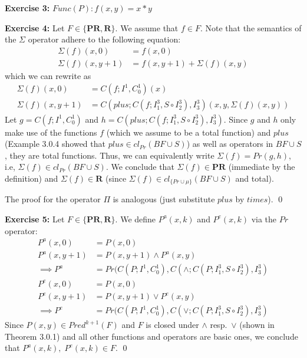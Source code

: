 \documentclass [11pt]{article}
\newcommand{\PR}{\textbf{PR}}
\newcommand{\R}{\textbf{R}}
\begin{document}
\bigskip
\noindent
\textbf{Exercise 3:}
$Func(P): f(x,y) = x*y$

\bigskip
\noindent
\textbf{Exercise 4:}
Let $F \in \{\PR, \R\}$. 
We assume that $f \in F$.
Note that the semantics of the $\Sigma$ operator adhere to the following equation:
\begin{align*}
\Sigma(f)(x,0) &= f(x,0) \\
\Sigma(f)(x, y+1) &= f(x,y+1) + \Sigma(f)(x,y)
\end{align*}
which we can rewrite as
\begin{align*}
\Sigma(f)(x,0) &= C(f; I^1, C^1_0)(x) \\
\Sigma(f)(x, y+1) &= C(plus; C(f; I^3_1, S \circ I^3_2), I^3_3) (x,y, \Sigma(f)(x,y))
\end{align*}
Let $g = C(f; I^1, C^1_0)$ and $h = C(plus; C(f; I^3_1, S \circ I^3_2), I^3_3)$. 
Since $g$ and $h$ only make use of the functions $f$ (which we assume to be a total function) and $plus$ (Example 3.0.4 showed that $plus \in cl_{Pr}(BF\cup S)$) as well as operators in $BF \cup S$, they are total functions.
Thus, we can equivalently write $\Sigma(f) = Pr(g, h)$, i.e, $\Sigma(f) \in cl_{Pr}(BF \cup S)$. 
We conclude that $\Sigma(f) \in \PR$ (immediate by the definition) and $\Sigma(f) \in \R$ (since $\Sigma(f) \in cl_{\{Pr \cup \mu \}}(BF \cup S)$ and total). 

\medskip
\noindent
The proof for the operator $\Pi$ is analogous (just substitute $plus$ by $times$).
\qed


\bigskip
\noindent
\textbf{Exercise 5:}
Let $F \in \{\PR, \R\}$. 
We define $P^a(x,k)$ and $P^e(x,k)$ via the $Pr$ operator:
\begin{align*}
P^a(x, 0) &= P(x,0) \\
P^a(x, y+1) &= P(x,y+1) \land P^a(x,y) \\
\implies P^a &= Pr(C(P; I^1, C^1_0),  C(\land; C(P; I^3_1, S \circ I^3_2), I^3_3) 
\end{align*}
\begin{align*}
P^e(x, 0) &= P(x,0) \\
P^e(x, y+1) &= P(x,y+1) \lor P^e(x,y) \\
\implies P^e &= Pr(C(P; I^1, C^1_0),  C(\lor; C(P; I^3_1, S \circ I^3_2), I^3_3) 
\end{align*}
Since $P(x,y) \in Pred^{k+1}(F)$ and $F$ is closed under $\land$ resp.~$\lor$ (shown in Theorem 3.0.1) and all other functions and operators are basic ones, we conclude that $P^a(x,k),\; P^e(x,k) \in F$.
\qed
\end{document}
